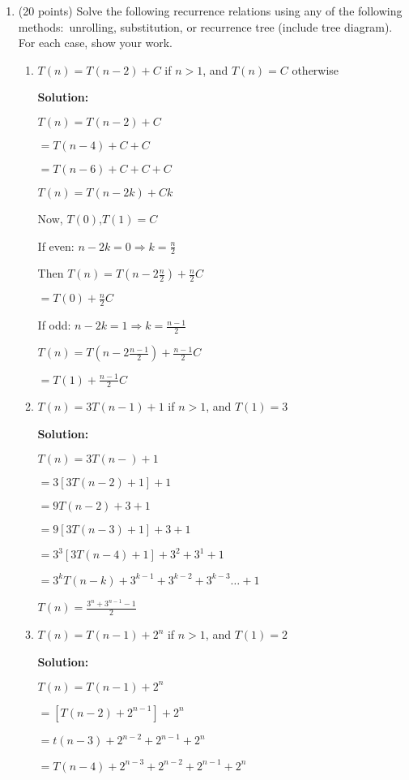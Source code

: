 \documentclass[12pt]{article}
\begin{document}
\begin{enumerate}
	\newpage

	\item (20 points) Solve the following recurrence relations using any of the following methods:\ unrolling, substitution, or 
	recurrence tree (include tree diagram). For each case, show your work.
    \begin{enumerate}
    	\item $T(n) = T(n-2) + C$ if $n>1$, and $T(n) = C$ otherwise\par
		\textbf{Solution:}\par
			$T(n) = T(n-2) + C$\par
			$= T(n-4) + C + C$\par
			$= T(n-6) + C + C + C$\par
			$T(n) = T(n-2k) + Ck$\par
			Now, $T(0)$,$T(1) = C$\par
			If even: $n-2k = 0 \Rightarrow k = \frac{n}{2}$\par
			Then $T(n) = T(n-2\frac{n}{2})+\frac{n}{2}C$\par
			$=T(0) + \frac{n}{2}C$\par
			If odd: $n-2k = 1 \Rightarrow k = \frac{n-1}{2}$\par
			$T(n) = T(n-2\frac{n-1}{2})+\frac{n-1}{2}C$\par
			$= T(1)+\frac{n-1}{2}C$\par
    	\item $T(n) = 3T(n-1) + 1$ if $n>1$, and $T(1) = 3$\par
		\textbf{Solution:}\par
		$T(n) = 3T(n-)+1$\par
			$= 3[3T(n-2) + 1] + 1$\par
			$= 9T(n-2) + 3 + 1$\par
			$= 9[3T(n-3)+1]+3+1$\par
			$= 3^3[3T(n-4)+1]+3^2 +3^1 +1$\par
			$= 3^kT(n-k)+3^{k-1}+3^{k-2}+3^{k-3}\dots +1$\par
			$T(n) = \frac{3^{n}+3^{n-1}-1}{2}$\par
	\newpage
    	\item $T(n) = T(n-1)+2^{n}$ if $n>1$, and $T(1) = 2$\par
		\textbf{Solution:}\par
		$T(n) = T(n-1)+2^{n}$\par
		$= [T(n-2)+2^{n-1}]+2^{n}$\par
		$= t(n-3)+2^{n-2}+2^{n-1}+2^{n}$\par
		$= T(n-4)+2^{n-3}+2^{n-2}+2^{n-1}+2^{n}$\par

\end{enumerate}
\end{enumerate}
\end{document}
